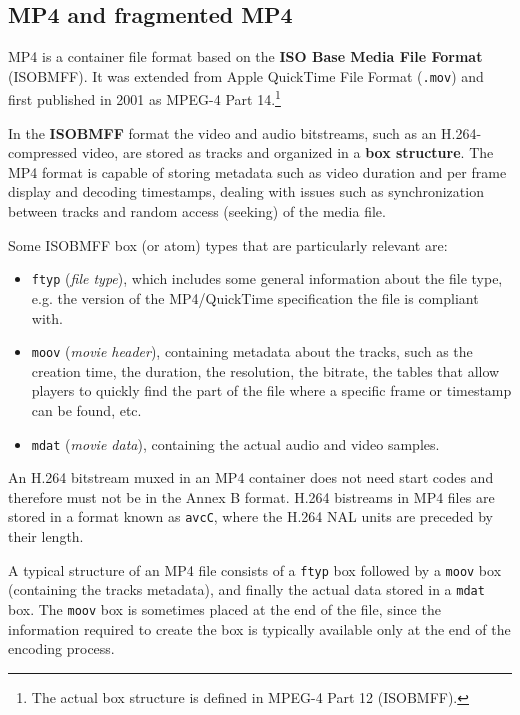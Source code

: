 \subsection{MP4 and fragmented MP4}
\label{sec:bg/containers/mp4}

MP4 is a container file format based on the \textbf{ISO Base Media File Format} (ISOBMFF). It was extended from Apple QuickTime File Format (\texttt{.mov}) and first published in 2001 as MPEG-4 Part 14.\footnote{The actual box structure is defined in MPEG-4 Part 12 (ISOBMFF).}\cite{mpeg4part12}

In the \textbf{ISOBMFF} format the video and audio bitstreams, such as an H.264-compressed video, are stored as tracks and organized in a \textbf{box structure}. The MP4 format is capable of storing metadata such as video duration and per frame display and decoding timestamps, dealing with issues such as synchronization between tracks and random access (seeking) of the media file.

Some ISOBMFF box (or atom) types that are particularly relevant are:

\begin{itemize}
    \item \texttt{ftyp} (\textit{file type}), which includes some general information about the file type, e.g. the version of the MP4/QuickTime specification the file is compliant with.
    \item \texttt{moov} (\textit{movie header}), containing metadata about the tracks, such as the creation time, the duration, the resolution, the bitrate, the tables that allow players to quickly find the part of the file where a specific frame or timestamp can be found, etc.
    \item \texttt{mdat} (\textit{movie data}), containing the actual audio and video samples.
\end{itemize}

An H.264 bitstream muxed in an MP4 container does not need start codes and therefore must not be in the Annex B format. H.264 bistreams in MP4 files are stored in a format known as \texttt{avcC}, where the H.264 NAL units are preceded by their length.

A typical structure of an MP4 file consists of a \texttt{ftyp} box followed by a \texttt{moov} box (containing the tracks metadata), and finally the actual data stored in a \texttt{mdat} box. The \texttt{moov} box is sometimes placed at the end of the file, since the information required to create the box is typically available only at the end of the encoding process.


